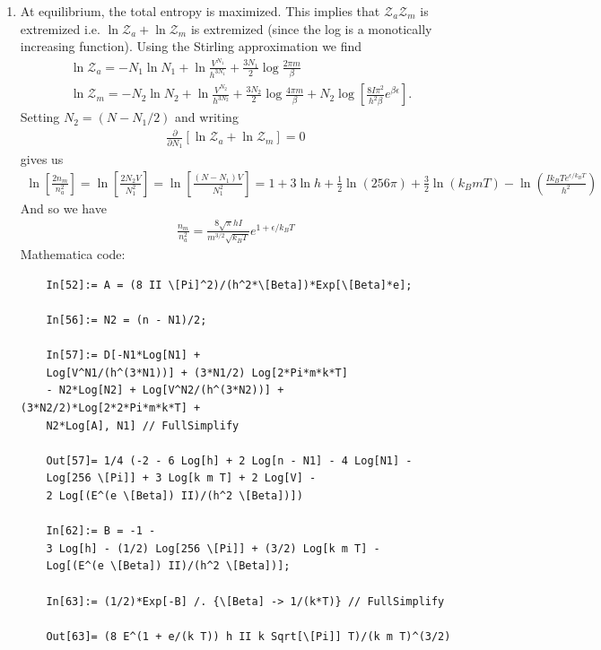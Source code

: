 \documentclass{article}
\theoremstyle{definition}
\newcommand{\p}{\partial}
\newcommand{\be}{\beta}
\newcommand{\f}[2]{\frac{#1}{#2}}
\newcommand{\lp}{\left(}
\newcommand{\rp}{\right)}
\newcommand{\lb}{\left[}
\newcommand{\rb}{\right]}
\begin{document}
\begin{enumerate}[label=(\alph*)]
	\item At equilibrium, the total entropy is maximized. This implies that $\mathcal{Z}_a\mathcal{Z}_m$ is extremized i.e. $\ln \mathcal{Z}_a + \ln \mathcal{Z}_m$ is extremized (since the log is a monotically increasing function). Using the Stirling approximation we find 
	\begin{align*}
	&\ln \mathcal{Z}_a  = -N_1 \ln N_1 + \ln \f{V^{N_1}}{h^{3N_1}} + \f{3N_1}{2}\log \f{2\pi m }{\be}\\
	&\ln \mathcal{Z}_m  = -N_2\ln N_2  + \ln \f{V^{N_2}}{h^{3N_2}} + \f{3N_2}{2}\log \f{4\pi m }{\be} + N_2\log \lb \f{8I\pi^2}{h^2\be} e^{\be\epsilon} \rb.
	\end{align*}
	Setting $N_2 = (N-N_1/2)$ and writing
	\begin{align*}
	\f{\p}{\p N_1}\lb  \ln \mathcal{Z}_a + \ln \mathcal{Z}_m \rb = 0
	\end{align*}
	gives us 
	\begin{align*}
	\ln \lb \f{2n_m}{n_a^2} \rb = \ln \lb \f{2N_2 V}{N_1^2} \rb = \ln \lb \f{(N-N_1)V}{N_1^2} \rb = 1 + 3\ln h + \f{1}{2}\ln (256\pi) + \f{3}{2}\ln (k_B m T) - \ln \lp \f{I k_BT e^{\epsilon/k_BT}}{h^2} \rp
	\end{align*}
	And so we have
	\begin{align*}
	\boxed{\f{n_m}{n_a^2} = \f{8\sqrt{\pi} hI  }{m^{3/2} \sqrt{k_BT}} e^{1+\epsilon/k_BT}}
	\end{align*}
	Mathematica code:
	\begin{lstlisting}
	In[52]:= A = (8 II \[Pi]^2)/(h^2*\[Beta])*Exp[\[Beta]*e];
	
	In[56]:= N2 = (n - N1)/2;
	
	In[57]:= D[-N1*Log[N1] + 
	Log[V^N1/(h^(3*N1))] + (3*N1/2) Log[2*Pi*m*k*T]
	- N2*Log[N2] + Log[V^N2/(h^(3*N2))] + (3*N2/2)*Log[2*2*Pi*m*k*T] + 
	N2*Log[A], N1] // FullSimplify
	
	Out[57]= 1/4 (-2 - 6 Log[h] + 2 Log[n - N1] - 4 Log[N1] - 
	Log[256 \[Pi]] + 3 Log[k m T] + 2 Log[V] - 
	2 Log[(E^(e \[Beta]) II)/(h^2 \[Beta])])
	
	In[62]:= B = -1 - 
	3 Log[h] - (1/2) Log[256 \[Pi]] + (3/2) Log[k m T] - 
	Log[(E^(e \[Beta]) II)/(h^2 \[Beta])];
	
	In[63]:= (1/2)*Exp[-B] /. {\[Beta] -> 1/(k*T)} // FullSimplify
	
	Out[63]= (8 E^(1 + e/(k T)) h II k Sqrt[\[Pi]] T)/(k m T)^(3/2)
	\end{lstlisting}
\end{enumerate}
\end{document}
